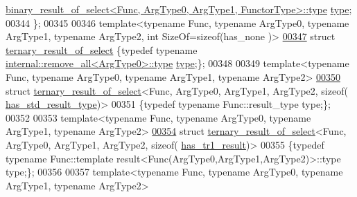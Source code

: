 \begin{DoxyCode}
      \hyperlink{group___sparse_core___module}{binary\_result\_of\_select<Func, ArgType0, ArgType1, FunctorType>::type}
       \hyperlink{group___sparse_core___module}{type};
00344 \};
00345 
00346 \textcolor{keyword}{template}<\textcolor{keyword}{typename} Func, \textcolor{keyword}{typename} ArgType0, \textcolor{keyword}{typename} ArgType1, \textcolor{keyword}{typename} ArgType2, \textcolor{keywordtype}{int} SizeOf=sizeof(has\_none
      )>
\hyperlink{struct_eigen_1_1internal_1_1ternary__result__of__select}{00347} \textcolor{keyword}{struct }\hyperlink{struct_eigen_1_1internal_1_1ternary__result__of__select}{ternary\_result\_of\_select} \{\textcolor{keyword}{typedef} \textcolor{keyword}{typename} 
      \hyperlink{group___sparse_core___module}{internal::remove\_all<ArgType0>::type} \hyperlink{group___sparse_core___module}{type};\};
00348 
00349 \textcolor{keyword}{template}<\textcolor{keyword}{typename} Func, \textcolor{keyword}{typename} ArgType0, \textcolor{keyword}{typename} ArgType1, \textcolor{keyword}{typename} ArgType2>
\hyperlink{struct_eigen_1_1internal_1_1ternary__result__of__select_3_01_func_00_01_arg_type0_00_01_arg_type08876e51e06da3c04eed1c2a00032f26}{00350} \textcolor{keyword}{struct }\hyperlink{struct_eigen_1_1internal_1_1ternary__result__of__select}{ternary\_result\_of\_select}<Func, ArgType0, ArgType1, ArgType2, sizeof(
      \hyperlink{struct_eigen_1_1internal_1_1has__std__result__type}{has\_std\_result\_type})>
00351 \{\textcolor{keyword}{typedef} \textcolor{keyword}{typename} Func::result\_type type;\};
00352 
00353 \textcolor{keyword}{template}<\textcolor{keyword}{typename} Func, \textcolor{keyword}{typename} ArgType0, \textcolor{keyword}{typename} ArgType1, \textcolor{keyword}{typename} ArgType2>
\hyperlink{struct_eigen_1_1internal_1_1ternary__result__of__select_3_01_func_00_01_arg_type0_00_01_arg_type6eb986b9b1e9aafbcbfee4e37d87eaa7}{00354} \textcolor{keyword}{struct }\hyperlink{struct_eigen_1_1internal_1_1ternary__result__of__select}{ternary\_result\_of\_select}<Func, ArgType0, ArgType1, ArgType2, sizeof(
      \hyperlink{struct_eigen_1_1internal_1_1has__tr1__result}{has\_tr1\_result})>
00355 \{\textcolor{keyword}{typedef} \textcolor{keyword}{typename} Func::template result<Func(ArgType0,ArgType1,ArgType2)>::type type;\};
00356 
00357 \textcolor{keyword}{template}<\textcolor{keyword}{typename} Func, \textcolor{keyword}{typename} ArgType0, \textcolor{keyword}{typename} ArgType1, \textcolor{keyword}{typename} ArgType2>

\end{DoxyCode}
